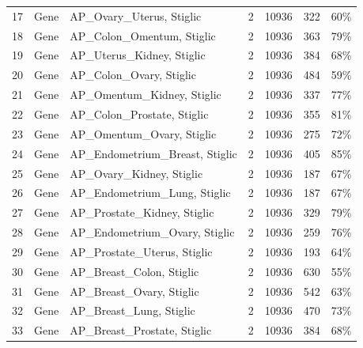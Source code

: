 \documentclass[preprint,12pt,authoryear]{elsarticle}
\begin{document}
{{\begin{longtable}{|c|p{1.9cm}|p{6.7cm}|c|p{0.75cm}|p{0.75cm}|p{0.75cm}|}
17 & Gene       & AP\_Ovary\_Uterus, Stiglic \citeyearpar{stiglic2010stability}     & 2 & 10936 & 322   & 60\% \\
18 & Gene       & AP\_Colon\_Omentum, Stiglic \citeyearpar{stiglic2010stability}    & 2 & 10936 & 363   & 79\% \\
19 & Gene       & AP\_Uterus\_Kidney, Stiglic \citeyearpar{stiglic2010stability}    & 2 & 10936 & 384   & 68\% \\
20 & Gene       & AP\_Colon\_Ovary, Stiglic \citeyearpar{stiglic2010stability}      & 2 & 10936 & 484   & 59\% \\
21 & Gene       & AP\_Omentum\_Kidney, Stiglic \citeyearpar{stiglic2010stability}   & 2 & 10936 & 337   & 77\% \\
22 & Gene       & AP\_Colon\_Prostate, Stiglic \citeyearpar{stiglic2010stability}   & 2 & 10936 & 355   & 81\% \\
23 & Gene       & AP\_Omentum\_Ovary, Stiglic \citeyearpar{stiglic2010stability}    & 2 & 10936 & 275   & 72\% \\
24 & Gene       & AP\_Endometrium\_Breast, Stiglic \citeyearpar{stiglic2010stability} & 2 & 10936 & 405 & 85\% \\
25 & Gene       & AP\_Ovary\_Kidney, Stiglic \citeyearpar{stiglic2010stability}     & 2 & 10936 & 187   & 67\% \\
26 & Gene       & AP\_Endometrium\_Lung, Stiglic \citeyearpar{stiglic2010stability} & 2 & 10936 & 187   & 67\% \\
27 & Gene       & AP\_Prostate\_Kidney, Stiglic \citeyearpar{stiglic2010stability}  & 2 & 10936 & 329   & 79\% \\
28 & Gene       & AP\_Endometrium\_Ovary, Stiglic \citeyearpar{stiglic2010stability}& 2 & 10936 & 259   & 76\% \\
29 & Gene       & AP\_Prostate\_Uterus, Stiglic \citeyearpar{stiglic2010stability}  & 2 & 10936 & 193   & 64\% \\
30 & Gene       & AP\_Breast\_Colon, Stiglic \citeyearpar{stiglic2010stability}     & 2 & 10936 & 630   & 55\% \\
31 & Gene       & AP\_Breast\_Ovary, Stiglic \citeyearpar{stiglic2010stability}     & 2 & 10936 & 542   & 63\% \\
32 & Gene       & AP\_Breast\_Lung, Stiglic \citeyearpar{stiglic2010stability}      & 2 & 10936 & 470   & 73\% \\
33 & Gene       & AP\_Breast\_Prostate, Stiglic \citeyearpar{stiglic2010stability}  & 2 & 10936 & 384   & 68\% \\

\end{longtable}}}
\end{document}
